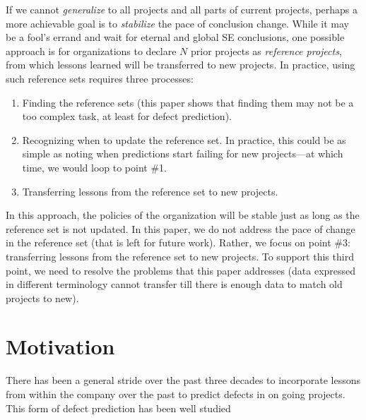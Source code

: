 \documentclass{sig-alternate}
\theoremstyle{break}
\begin{document}
If we cannot {\em generalize} to all projects and all parts
of current projects, perhaps a more achievable goal is to {\em
stabilize} the pace of conclusion change.
While it may be
a fool's errand  and wait for  eternal and global SE
conclusions, one possible approach is for organizations
to declare $N$ prior projects as {\em reference projects},
from which lessons learned will be transferred to new projects.
In practice, using such reference sets requires three processes:

\begin{enumerate}
\item Finding the reference sets (this paper shows that finding
 them may not be a too complex task, at least for defect prediction).
 \item Recognizing when to update  the reference set. In practice,
 this could be as simple as noting when predictions start failing for
new projects---at which time, we would loop to point \#1.
\item Transferring
 lessons from the reference set to new projects.
\end{enumerate}

In this approach, the policies of the organization will be stable just as long as the reference set is not updated. In this paper, we do not address the pace of change in the reference set (that is left for future work). Rather, we focus on point \#3: transferring lessons from the reference set to new projects. To support this third point, we need to resolve the problems that this paper addresses (data expressed in different terminology cannot transfer till there is enough data to match old projects to new).

\section{Motivation}
There has been a general stride over the past three decades to incorporate lessons from within the company over the past to predict defects in on going projects. This form of defect prediction has been well studied \cite{1-7}

\balance


\end{document}
